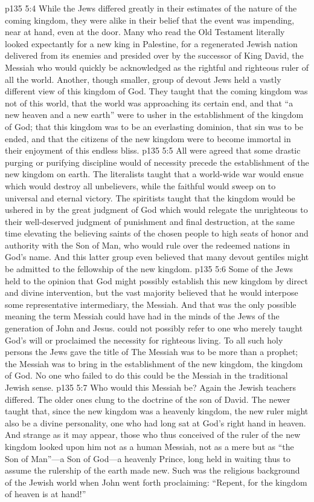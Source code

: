 \vs p135 5:4 While the Jews differed greatly in their estimates of the nature of the coming kingdom, they were alike in their belief that the event was impending, near at hand, even at the door. Many who read the Old Testament literally looked expectantly for a new king in Palestine, for a regenerated Jewish nation delivered from its enemies and presided over by the successor of King David, the Messiah who would quickly be acknowledged as the rightful and righteous ruler of all the world. Another, though smaller, group of devout Jews held a vastly different view of this kingdom of God. They taught that the coming kingdom was not of this world, that the world was approaching its certain end, and that “a new heaven and a new earth” were to usher in the establishment of the kingdom of God; that this kingdom was to be an everlasting dominion, that sin was to be ended, and that the citizens of the new kingdom were to become immortal in their enjoyment of this endless bliss.
\vs p135 5:5 All were agreed that some drastic purging or purifying discipline would of necessity precede the establishment of the new kingdom on earth. The literalists taught that a world\hyp{}wide war would ensue which would destroy all unbelievers, while the faithful would sweep on to universal and eternal victory. The spiritists taught that the kingdom would be ushered in by the great judgment of God which would relegate the unrighteous to their well\hyp{}deserved judgment of punishment and final destruction, at the same time elevating the believing saints of the chosen people to high seats of honor and authority with the Son of Man, who would rule over the redeemed nations in God’s name. And this latter group even believed that many devout gentiles might be admitted to the fellowship of the new kingdom.
\vs p135 5:6 Some of the Jews held to the opinion that God might possibly establish this new kingdom by direct and divine intervention, but the vast majority believed that he would interpose some representative intermediary, the Messiah. And that was the only possible meaning the term Messiah could have had in the minds of the Jews of the generation of John and Jesus.  could not possibly refer to one who merely taught God’s will or proclaimed the necessity for righteous living. To all such holy persons the Jews gave the title of  The Messiah was to be more than a prophet; the Messiah was to bring in the establishment of the new kingdom, the kingdom of God. No one who failed to do this could be the Messiah in the traditional Jewish sense.
\vs p135 5:7 Who would this Messiah be? Again the Jewish teachers differed. The older ones clung to the doctrine of the son of David. The newer taught that, since the new kingdom was a heavenly kingdom, the new ruler might also be a divine personality, one who had long sat at God’s right hand in heaven. And strange as it may appear, those who thus conceived of the ruler of the new kingdom looked upon him not as a human Messiah, not as a mere  but as “the Son of Man”---a Son of God---a heavenly Prince, long held in waiting thus to assume the rulership of the earth made new. Such was the religious background of the Jewish world when John went forth proclaiming: “Repent, for the kingdom of heaven is at hand!”
